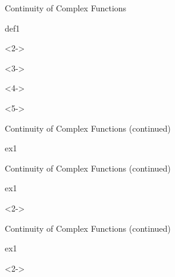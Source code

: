 \def\EMtitlesize{26}\def\EMtitleskip{31}
\begin{frame}{Continuity of Complex Functions}
\begin{EMbox}{def}{1}{}
\begin{uncoverenv}<2->
\end{uncoverenv}
\EMgap
\begin{uncoverenv}<3->
\end{uncoverenv}
\EMgap
\begin{uncoverenv}<4->
\end{uncoverenv}
\EMgap
\begin{uncoverenv}<5->
\end{uncoverenv}
\end{EMbox}
\end{frame}

\def\EMtitlesize{26}\def\EMtitleskip{31}
\begin{frame}{Continuity of Complex Functions (continued)}
\begin{EMbox}{ex}{1}{}
\end{EMbox}
\end{frame}

\def\EMtitlesize{26}\def\EMtitleskip{31}
\begin{frame}{Continuity of Complex Functions (continued)}
\begin{EMbox}{ex}{1}{}
\vspace{3bp}
\EMgap
\begin{uncoverenv}<2->
\end{uncoverenv}
\end{EMbox}
\end{frame}

\def\EMtitlesize{26}\def\EMtitleskip{31}
\begin{frame}{Continuity of Complex Functions (continued)}
\begin{EMbox}{ex}{1}{}
\vspace{3bp}
\EMgap
\begin{uncoverenv}<2->
\end{uncoverenv}
\end{EMbox}
\end{frame}


